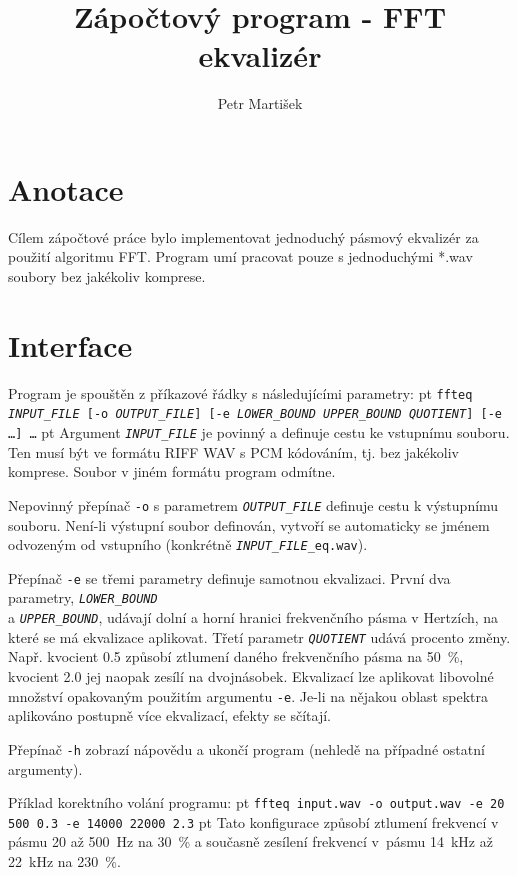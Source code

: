 \documentclass[11pt]{article} %
\title{Zápočtový program - FFT ekvalizér}
\author{Petr Martišek}
\date{} %
\begin{document}
\maketitle

\section{Anotace}
Cílem zápočtové práce bylo implementovat jednoduchý pásmový ekvalizér za použití algoritmu FFT. Program umí pracovat pouze s jednoduchými *.wav soubory bez jakékoliv komprese.

\section{Interface}
Program je spouštěn z příkazové řádky s následujícími parametry:
 pt
\texttt{ffteq \emph{INPUT\_FILE} [-o \emph{OUTPUT\_FILE}] [-e \emph{LOWER\_BOUND UPPER\_BOUND QUOTIENT}] [-e \ldots] \ldots}
 pt
\noindent Argument \texttt{\emph{INPUT\_FILE}} je povinný a definuje cestu ke vstupnímu souboru. Ten musí být ve formátu RIFF WAV s PCM kódováním, tj. bez jakékoliv komprese. Soubor v jiném formátu program odmítne.

Nepovinný přepínač \texttt{-o} s parametrem \texttt{\emph{OUTPUT\_FILE}} definuje cestu k výstupnímu souboru. Není-li výstupní soubor definován, vytvoří se automaticky se jménem odvozeným od vstupního (konkrétně \texttt{\emph{INPUT\_FILE}\_eq.wav}).

Přepínač \texttt{-e} se třemi parametry definuje samotnou ekvalizaci. První dva parametry, \texttt{\emph{LOWER\_BOUND}}\\ a \texttt{\emph{UPPER\_BOUND}}, udávají dolní a horní hranici frekvenčního pásma v Hertzích, na které se má ekvalizace aplikovat. Třetí parametr \texttt{\emph{QUOTIENT}} udává procento změny. Např. kvocient 0.5 způsobí ztlumení daného frekvenčního pásma na 50~\%, kvocient 2.0 jej naopak zesílí na dvojnásobek. Ekvalizací lze aplikovat libovolné množství opakovaným použitím argumentu \texttt{-e}. Je-li na nějakou oblast spektra aplikováno postupně více ekvalizací, efekty se sčítají.

Přepínač \texttt{-h} zobrazí nápovědu a ukončí program (nehledě na případné ostatní argumenty).

Příklad korektního volání programu:
 pt
\texttt{ffteq input.wav -o output.wav -e 20 500 0.3 -e 14000 22000 2.3}
 pt
Tato konfigurace způsobí ztlumení frekvencí v pásmu 20 až 500~Hz na 30~\% a současně zesílení frekvencí v~pásmu 14~kHz až 22~kHz na 230~\%.
\end{document}
